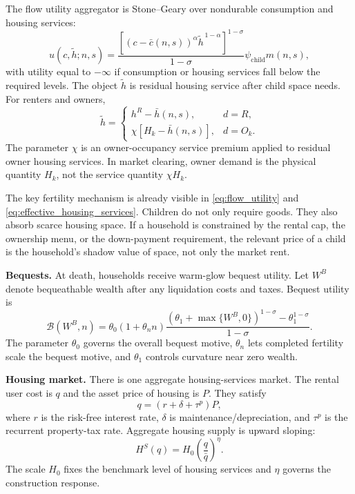 \documentclass[11pt]{article}
\newcommand{\Bcal}{\mathcal B}
\begin{document}
The flow utility aggregator is Stone--Geary over nondurable consumption and
housing services:
\begin{equation}
u(c,\widetilde h;n,s)
=
\frac{
\left[
\left(c-\bar c(n,s)\right)^\alpha
\widetilde h^{\,1-\alpha}
\right]^{1-\sigma}
}{1-\sigma}
\psi_{\mathrm{child}}m(n,s),
\label{eq:flow_utility}
\end{equation}
with utility equal to $-\infty$ if consumption or housing services fall below
the required levels. The object $\widetilde h$ is residual housing service
after child space needs. For renters and owners,
\begin{equation}
\widetilde h =
\begin{cases}
h^R-\bar h(n,s), & d=R,\\
\chi\left[H_k-\bar h(n,s)\right], & d=O_k.
\end{cases}
\label{eq:effective_housing_services}
\end{equation}
The parameter $\chi$ is an owner-occupancy service premium applied to residual
owner housing services. In market clearing, owner demand is the physical
quantity $H_k$, not the service quantity $\chi H_k$.

The key fertility mechanism is already visible in \eqref{eq:flow_utility} and
\eqref{eq:effective_housing_services}. Children do not only require goods.
They also absorb scarce housing space. If a household is constrained by the
rental cap, the ownership menu, or the down-payment requirement, the relevant
price of a child is the household's shadow value of space, not only the market
rent.

\textbf{Bequests.}
At death, households receive warm-glow bequest utility. Let $W^B$ denote
bequeathable wealth after any liquidation costs and taxes. Bequest utility is
\begin{equation}
\Bcal(W^B,n)
=
\theta_0(1+\theta_n n)
\frac{
\left(\theta_1+\max\{W^B,0\}\right)^{1-\sigma}
-\theta_1^{1-\sigma}
}{1-\sigma}.
\label{eq:bequest}
\end{equation}
The parameter $\theta_0$ governs the overall bequest motive, $\theta_n$ lets
completed fertility scale the bequest motive, and $\theta_1$ controls curvature
near zero wealth.

\textbf{Housing market.}
There is one aggregate housing-services market. The rental user cost is $q$ and
the asset price of housing is $P$. They satisfy
\begin{equation}
    q=(r+\delta+\tau^p)P,
    \label{eq:user_cost}
\end{equation}
where $r$ is the risk-free interest rate, $\delta$ is maintenance/depreciation,
and $\tau^p$ is the recurrent property-tax rate. Aggregate housing supply is
upward sloping:
\begin{equation}
    H^S(q)=H_0\left(\frac{q}{\bar q}\right)^\eta.
    \label{eq:housing_supply}
\end{equation}
The scale $H_0$ fixes the benchmark level of housing services and $\eta$
governs the construction response.
\end{document}

